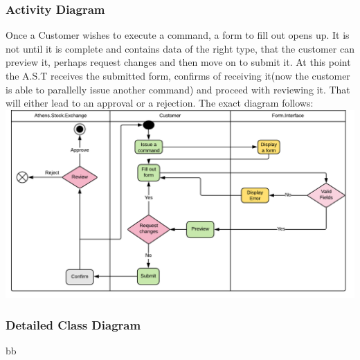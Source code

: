 \documentclass{article}
\begin{document}
\subsubsection{Activity Diagram}
Once a Customer wishes to execute a command, a form to fill out opens up. It is not until it is complete and contains data of the right type, that the customer can preview it, perhaps request changes and then move on to submit it. At this point the A.S.T receives the submitted form, confirms of receiving it(now the customer is able to parallelly issue another command) and proceed with reviewing it. That will either lead to an approval or a rejection. The exact diagram follows:\\
\includegraphics[scale=0.6]{activity}    

\newpage
\subsubsection{Detailed Class Diagram}
bb

\newpage
\end{document}
